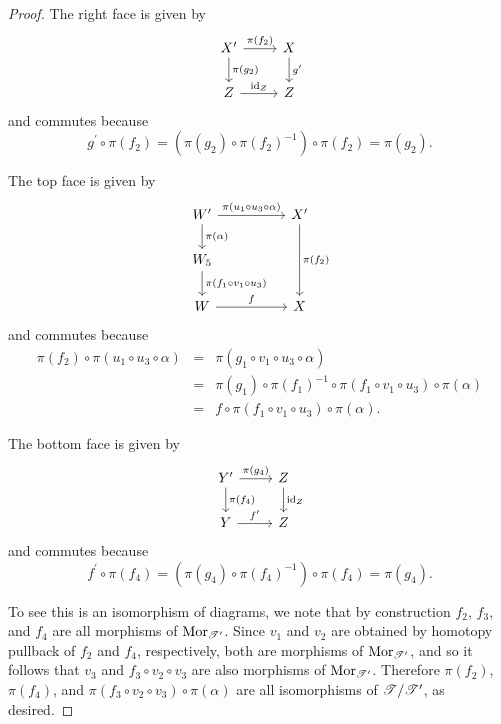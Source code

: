 \documentclass[dissertation.tex]{subfiles}
\begin{document}
\begin{lem}
\begin{proof}
    The right face is given by
    $$\begin{tikzcd}
      X^\prime \arrow{r}{\pi(f_2)}\arrow{d}{\pi(g_2)} & X\arrow{d}{g^\prime}\\
      Z \arrow{r}{\id_Z} & Z
    \end{tikzcd}$$
    and commutes because
    $$g^\prime \circ \pi(f_2) = \left(\pi(g_2) \circ \pi(f_2)^{-1}\right) \circ \pi(f_2) = \pi(g_2).$$

    The top face is given by
    $$\begin{tikzcd}
      W^\prime \arrow{rr}{\pi(u_1 \circ u_3 \circ \alpha)}\arrow{d}{\pi(\alpha)} & & X^\prime\arrow{dd}{\pi(f_2)}\\
      W_5\arrow{d}{\pi(f_1 \circ v_1 \circ u_3)}\\
      W \arrow{rr}{f} & & X
    \end{tikzcd}$$
    and commutes because
    \begin{eqnarray*}
      \pi(f_2) \circ \pi(u_1 \circ u_3 \circ \alpha) &=& \pi(g_1 \circ v_1 \circ u_3 \circ \alpha)\\
      &=& \pi(g_1) \circ \pi(f_1)^{-1} \circ \pi(f_1 \circ v_1 \circ u_3) \circ \pi(\alpha)\\
      &=& f \circ \pi(f_1 \circ v_1 \circ u_3)\circ\pi(\alpha).
    \end{eqnarray*}
    
    The bottom face is given by
    $$\begin{tikzcd}
      Y^\prime\arrow{r}{\pi(g_4)}\arrow{d}{\pi(f_4)} & Z\arrow{d}{\id_Z}\\
      Y\arrow{r}{f^\prime} & Z
    \end{tikzcd}$$
    and commutes because
    $$f^\prime \circ \pi(f_4) = \left(\pi(g_4) \circ \pi(f_4)^{-1}\right) \circ \pi(f_4) = \pi(g_4).$$
    
    To see this is an isomorphism of diagrams, we note that by construction $f_2$, $f_3$, and $f_4$ are all morphisms of $\operatorname{Mor}_{\mathscr{T}^\prime}$.
    Since $v_1$ and $v_2$ are obtained by homotopy pullback of $f_2$ and $f_4$, respectively, both are morphisms of $\operatorname{Mor}_{\mathscr{T}^\prime}$, and so it follows that $v_3$ and $f_3 \circ v_2 \circ v_3$ are also morphisms of $\operatorname{Mor}_{\mathscr{T}^\prime}$.
    Therefore $\pi(f_2)$, $\pi(f_4)$, and $\pi(f_3 \circ v_2 \circ v_3) \circ \pi(\alpha)$ are all isomorphisms of $\mathscr{T}/\mathscr{T}^\prime$, as desired.
  \end{proof}
\end{lem}
\end{document}
